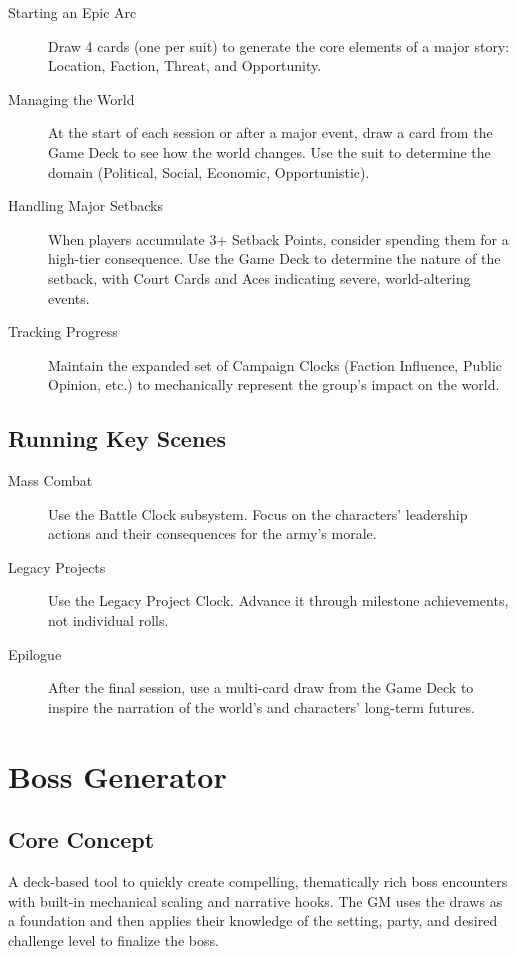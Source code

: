\begin{description}
    \item[Starting an Epic Arc] Draw 4 cards (one per suit) to generate the core elements of a major story: Location, Faction, Threat, and Opportunity.
    \item[Managing the World] At the start of each session or after a major event, draw a card from the Game Deck to see how the world changes. Use the suit to determine the domain (Political, Social, Economic, Opportunistic).
    \item[Handling Major Setbacks] When players accumulate 3+ Setback Points, consider spending them for a high-tier consequence. Use the Game Deck to determine the nature of the setback, with Court Cards and Aces indicating severe, world-altering events.
    \item[Tracking Progress] Maintain the expanded set of Campaign Clocks (Faction Influence, Public Opinion, etc.) to mechanically represent the group's impact on the world.
\end{description}

\subsection*{Running Key Scenes}

\begin{description}
    \item[Mass Combat] Use the Battle Clock subsystem. Focus on the characters' leadership actions and their consequences for the army's morale.
    \item[Legacy Projects] Use the Legacy Project Clock. Advance it through milestone achievements, not individual rolls.
    \item[Epilogue] After the final session, use a multi-card draw from the Game Deck to inspire the narration of the world's and characters' long-term futures.
\end{description}

\section{Boss Generator}

\subsection{Core Concept}

A deck-based tool to quickly create compelling, thematically rich boss encounters with built-in mechanical scaling and narrative hooks. The GM uses the draws as a foundation and then applies their knowledge of the setting, party, and desired challenge level to finalize the boss.

